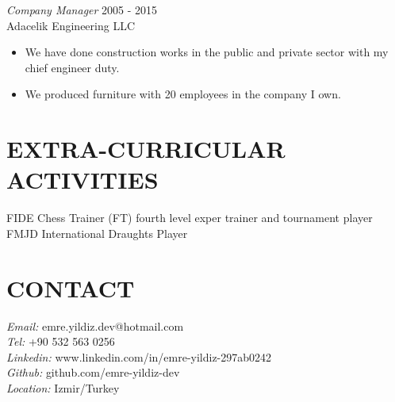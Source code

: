 \documentclass[line,margin]{res}
\begin{document}
\begin{resume}

                 
                {\sl Company Manager} \hfill        2005 - 2015 \\
                Adacelik Engineering LLC
                  \begin{itemize}
                   \item We have done construction works in the public and private sector with my chief engineer duty.
                     
                   \item We produced furniture with 20 employees in the company I own.
                   \end{itemize} 
 
\section{EXTRA-CURRICULAR \\ ACTIVITIES}             
                FIDE Chess Trainer (FT) fourth level exper trainer and tournament player \\
                FMJD International Draughts Player \\
                

\section{CONTACT}  {\sl Email: } emre.yildiz.dev@hotmail.com \\ 
{\sl Tel: } +90 532 563 0256 \\ 
{\sl Linkedin: } www.linkedin.com/in/emre-yildiz-297ab0242\\ 
{\sl Github: } github.com/emre-yildiz-dev\\ 
{\sl Location: } Izmir/Turkey \\ 



\end{resume}
                 
\end{document}
